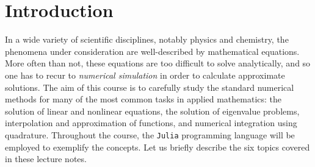 \chapter*{Introduction}%
In a wide variety of scientific disciplines,
notably physics and chemistry,
the phenomena under consideration are well-described by mathematical equations.
More often than not,
these equations are too difficult to solve analytically,
and so one has to recur to \emph{numerical simulation} in order to calculate approximate solutions.
The aim of this course is to carefully study the standard numerical methods for many of the most common tasks in applied mathematics:
the solution of linear and nonlinear equations,
the solution of eigenvalue problems,
interpolation and approximation of functions,
and numerical integration using quadrature.
Throughout the course, the \texttt{Julia} programming language will be employed to exemplify the concepts.
Let us briefly describe the six topics covered in these lecture notes.

